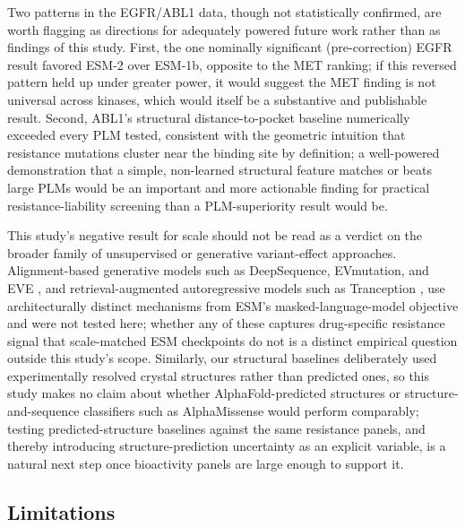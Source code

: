 \documentclass[pdflatex,sn-mathphys-num]{sn-jnl}%
\theoremstyle{thmstyleone}%
\theoremstyle{thmstyletwo}%
\theoremstyle{thmstylethree}%
\begin{document}
Two patterns in the EGFR/ABL1 data, though not statistically confirmed, are worth flagging as directions for adequately powered future work rather than as findings of this study. First, the one nominally significant (pre-correction) EGFR result favored ESM-2 over ESM-1b, opposite to the MET ranking; if this reversed pattern held up under greater power, it would suggest the MET finding is not universal across kinases, which would itself be a substantive and publishable result. Second, ABL1's structural distance-to-pocket baseline numerically exceeded every PLM tested, consistent with the geometric intuition that resistance mutations cluster near the binding site by definition; a well-powered demonstration that a simple, non-learned structural feature matches or beats large PLMs would be an important and more actionable finding for practical resistance-liability screening than a PLM-superiority result would be.

This study's negative result for scale should not be read as a verdict on the broader family of unsupervised or generative variant-effect approaches. Alignment-based generative models such as DeepSequence, EVmutation, and EVE \citep{Riesselman2018,Hopf2017,Frazer2021}, and retrieval-augmented autoregressive models such as Tranception \citep{Notin2022}, use architecturally distinct mechanisms from ESM's masked-language-model objective and were not tested here; whether any of these captures drug-specific resistance signal that scale-matched ESM checkpoints do not is a distinct empirical question outside this study's scope. Similarly, our structural baselines deliberately used experimentally resolved crystal structures rather than predicted ones, so this study makes no claim about whether AlphaFold-predicted structures \citep{Jumper2021} or structure-and-sequence classifiers such as AlphaMissense \citep{Cheng2023} would perform comparably; testing predicted-structure baselines against the same resistance panels, and thereby introducing structure-prediction uncertainty as an explicit variable, is a natural next step once bioactivity panels are large enough to support it.

\subsection{Limitations}\label{subsec4-1}
\end{document}

